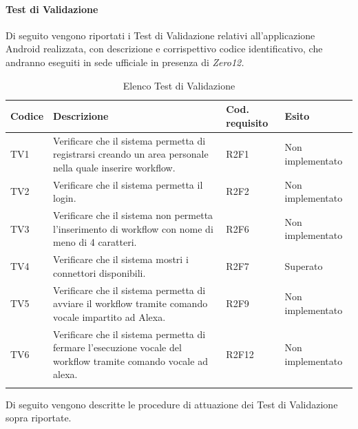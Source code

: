 \paragraph{Test di Validazione}
\label{sec:tvRA}
Di seguito vengono riportati i Test di Validazione relativi all'applicazione Android realizzata, con descrizione e corrispettivo codice identificativo, che andranno eseguiti in sede ufficiale in presenza di \textit{Zero12.}
\begin{center}
	\centering
	\renewcommand{\arraystretch}{1.5}
	\begin{longtable}{  p{1.2cm}  p{8.5cm} p{2cm} p{1.5cm} }
		\rowcolor{tableHeadYellow}
		\textbf{Codice}   & \textbf{Descrizione} & \textbf{Cod. \mbox{requisito}} & \textbf{Esito} \\ 
		\endhead
		TV1 & Verificare che il sistema permetta di registrarsi creando un area personale nella quale inserire workflow. & R2F1 & Non implementato \\
		TV2 & Verificare che il sistema permetta il login. & R2F2 & Non implementato \\
		TV3 & Verificare che il sistema non permetta l’inserimento di workflow con nome di meno di 4 caratteri. & R2F6 & Non implementato \\
		TV4 & Verificare che il sistema mostri i connettori disponibili. & R2F7 & Superato \\
		TV5 & Verificare che il sistema permetta di avviare il workflow tramite comando vocale impartito ad Alexa. & R2F9 & Non implementato \\
		TV6 & Verificare che il sistema permetta di fermare l’esecuzione vocale del workflow tramite comando vocale ad alexa. & R2F12 & Non implementato \\
		\rowcolor{white}
		\caption{Elenco Test di Validazione}
	\end{longtable}
\end{center}
Di seguito vengono descritte le procedure di attuazione dei Test di Validazione sopra riportate.
